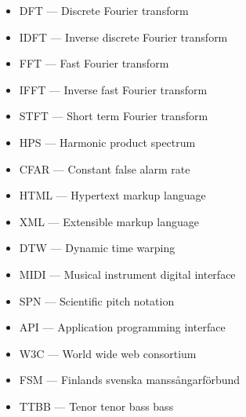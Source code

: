 \begin{itemize}
  \item DFT — Discrete Fourier transform 
  \item IDFT — Inverse discrete Fourier transform 
  \item FFT — Fast Fourier transform 
  \item IFFT — Inverse fast Fourier transform 
  \item STFT — Short term Fourier transform 
  \item HPS — Harmonic product spectrum
  \item CFAR — Constant false alarm rate 
  \item HTML — Hypertext markup language 
  \item XML — Extensible markup language 
  \item DTW — Dynamic time warping 
  \item MIDI — Musical instrument digital interface 
  \item SPN — Scientific pitch notation 
  \item API — Application programming interface 
  \item W3C — World wide web consortium
  \item FSM — Finlands svenska manssångarförbund
  \item TTBB — Tenor tenor bass bass 
\end{itemize}
